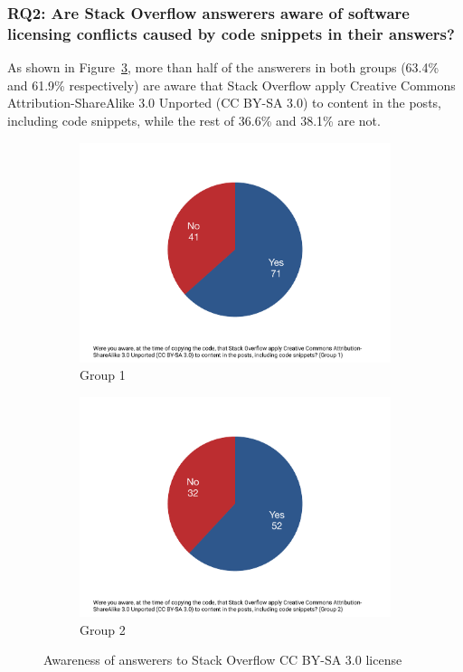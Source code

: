 \documentclass{svjour3}                     %
\begin{document}
\vspace{0.5cm}
\noindent{}
\vspace{0.5cm}

\subsubsection*{RQ2: Are Stack Overflow answerers aware of software licensing conflicts caused by code snippets in their answers?} 

As shown in Figure~\ref{fig:survey_license_known}, more than half of the
answerers in both groups (63.4\% and 61.9\% respectively) are aware that Stack
Overflow apply Creative Commons Attribution-ShareAlike 3.0 Unported (CC BY-SA
3.0) to content in the posts, including code snippets, while the rest of 36.6\%
and 38.1\% are not. 

\begin{figure}
	\begin{subfigure}{.5\textwidth}
		\centering
		\includegraphics[width=.4\linewidth]{survey_license_known_1}
		\caption{Group 1}
		\label{fig:survey_license_known_1}
	\end{subfigure}%
	\begin{subfigure}{.5\textwidth}
		\centering
		\includegraphics[width=.4\linewidth]{survey_license_known_2}
		\caption{Group 2}
		\label{fig:survey_license_known_2}
	\end{subfigure}
	\caption{Awareness of answerers to Stack Overflow CC BY-SA 3.0 license}
	\label{fig:survey_license_known}
\end{figure}
\end{document}
